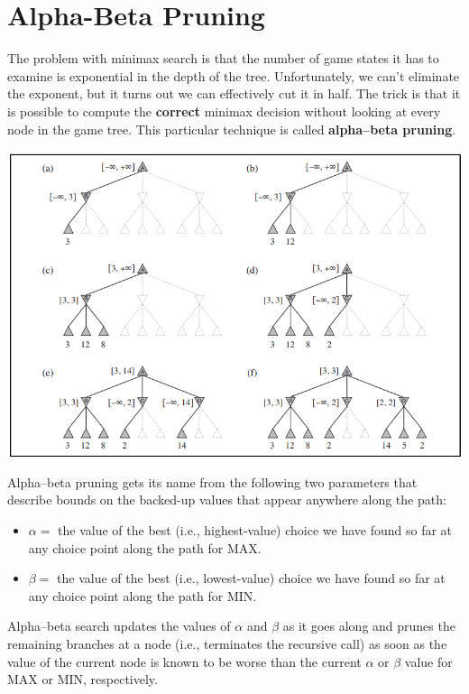 \section{Alpha-Beta Pruning}
The problem with minimax search is that the number of game states it has to examine is exponential in the depth of the tree. Unfortunately, we can’t eliminate the exponent, but it turns out we can effectively cut it in half. The trick is that it is possible to compute the \textbf{correct} minimax decision without looking at every node in the game tree. This particular technique  is called \textbf{alpha–beta pruning}.
\begin{center}
    \includegraphics[]{images/alpha-beta pruning.png}
\end{center}
Alpha–beta pruning gets its name from the following two parameters that describe bounds on the backed-up values that appear anywhere along the path:
\begin{itemize}
    \item $\alpha = $ the value of the best (i.e., highest-value) choice we have found so far at any choice point along the path for MAX.

    \item $\beta = $ the value of the best (i.e., lowest-value) choice we have found so far at any choice point along the path for MIN.
\end{itemize}
Alpha–beta search updates the values of $\alpha$ and $\beta$ as it goes along and prunes the remaining branches at a node (i.e., terminates the recursive call) as soon as the value of the current node is known to be worse than the current $\alpha$ or $\beta$ value for MAX or MIN, respectively.
